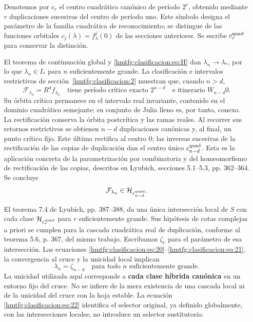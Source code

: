 Denotemos por \(c_r\) el centro cuadrático canónico de período \(2^r\), obtenido mediante \(r\) duplicaciones sucesivas del centro de período uno. Este símbolo designa el parámetro de la familia cuadrática de reconocimiento; se distingue de las funciones orbitales \(c_j(\lambda)=f_\lambda^j(0)\) de las secciones anteriores. Se escribe \(c_r^{\rm quad}\) para conservar la distinción.

El teorema de continuación global y \eqref{hmtfg:clasificacion:eq:H} dan \(\lambda_n\to\lambda_*\), por lo que \(\lambda_n\in I_*\) para \(n\) suficientemente grande. La clasificación e intervalos restrictivos de sección~\ref{hmtfg:clasificacion:2} muestran que, cuando \(n>d\),
\begin{equation}
\mathcal F_{\lambda_n}=R^df_{\lambda_n}
\quad\text{tiene período crítico exacto }2^{n-d}
\quad\text{e itinerario }W_{n-d}0.
\label{hmtfg:clasificacion:eq:20}
\end{equation}
Su órbita crítica permanece en el intervalo real invariante, contenido en el dominio cuadrático semejante; su conjunto de Julia lleno es, por tanto, conexo. La rectificación conserva la órbita postcrítica y las ramas reales. Al recorrer sus retornos restrictivos se obtienen \(n-d\) duplicaciones canónicas y, al final, un punto crítico fijo. Este último rectifica al centro \(0\); las inversas sucesivas de la rectificación de las copias de duplicación dan el centro único \(c_{n-d}^{\rm quad}\). Esta es la aplicación concreta de la parametrización por combinatoria y del homeomorfismo de rectificación de las copias, descritos en Lyubich, secciones 5.1–5.3, pp. 362–364. Se concluye
\begin{equation}
\mathcal F_{\lambda_n}\in\mathcal H_{c_{n-d}^{\rm quad}}.
\label{hmtfg:clasificacion:eq:21}
\end{equation}

El teorema 7.4 de Lyubich, pp. 387–388, da una única intersección local de \(S\) con cada clase \(\mathcal H_{c_r^{\rm quad}}\) para \(r\) suficientemente grande. Sus hipótesis de cotas complejas a priori se cumplen para la cascada cuadrática real de duplicación, conforme al teorema 5.6, p. 367, del mismo trabajo. Escribamos \(\zeta_r\) para el parámetro de esa intersección. Las ecuaciones \eqref{hmtfg:clasificacion:eq:20}–\eqref{hmtfg:clasificacion:eq:21}, la convergencia al cruce y la unicidad local implican
\begin{equation}
\boxed{\lambda_n=\zeta_{n-d}\quad\text{para todo }n\text{ suficientemente grande}.}
\label{hmtfg:clasificacion:eq:22}
\end{equation}
La unicidad utilizada aquí corresponde a \textbf{cada clase híbrida canónica} en un entorno fijo del cruce. No se infiere de la mera existencia de una cascada local ni de la unicidad del cruce con la hoja estable. La ecuación \eqref{hmtfg:clasificacion:eq:22} identifica el selector original, ya definido globalmente, con las intersecciones locales; no introduce un selector sustitutorio.

